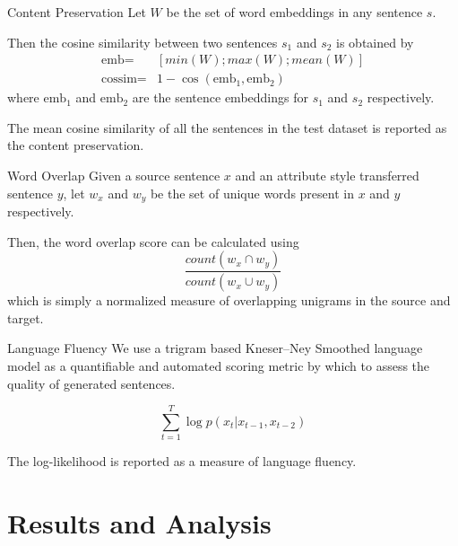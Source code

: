 \documentclass[aspectratio=169]{beamer}
\begin{document}
\begin{frame}{Content Preservation}
	Let $W$ be the set of word embeddings in any sentence $s$.

	Then the cosine similarity between two sentences $s_1$ and $s_2$ is obtained by
	\begin{align*}
		\text{emb} =    & [min(W);max(W);mean(W)]              \\
		\text{cossim} = & 1 - \cos(\text{emb}_1, \text{emb}_2)
	\end{align*}
	where $\text{emb}_1$ and $\text{emb}_2$ are the sentence embeddings for $s_1$ and $s_2$ respectively.

	The mean cosine similarity of all the sentences in the test dataset is reported as the content preservation.
\end{frame}

\begin{frame}{Word Overlap}
	Given a source sentence $x$ and an attribute style transferred sentence $y$, let $w_x$ and $w_y$ be the set of unique words present in $x$ and $y$ respectively.

	Then, the word overlap score can be calculated using
	\begin{equation*}
		\frac{count(w_x \cap w_y)}{count(w_x \cup w_y)}
	\end{equation*}
	which is simply a normalized measure of overlapping unigrams in the source and target.
\end{frame}

\begin{frame}{Language Fluency}
	We use a trigram based Kneser–Ney Smoothed language model \citep{kneser1995improved} as a quantifiable and automated scoring metric by which to assess the quality of generated sentences.

	\begin{equation*}
		\sum_{t=1}^T \log p(x_t | x_{t-1}, x_{t-2})
	\end{equation*}

	The log-likelihood is reported as a measure of language fluency.
\end{frame}


% 

\section{Results and Analysis}
\end{document}

